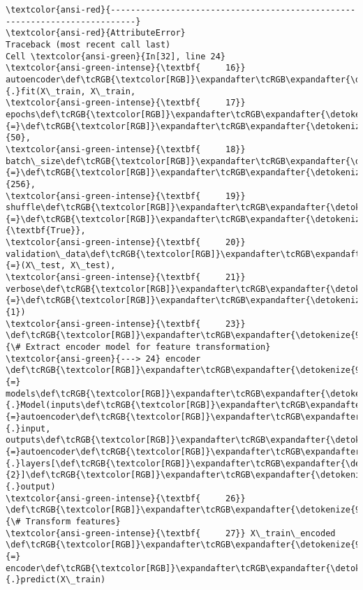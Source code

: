 \documentclass[11pt]{article}
\begin{document}
    \begin{Verbatim}[commandchars=\\\{\}, frame=single, framerule=2mm, rulecolor=\color{outerrorbackground}]
\textcolor{ansi-red}{---------------------------------------------------------------------------}
\textcolor{ansi-red}{AttributeError}                            Traceback (most recent call last)
Cell \textcolor{ansi-green}{In[32], line 24}
\textcolor{ansi-green-intense}{\textbf{     16}} autoencoder\def\tcRGB{\textcolor[RGB]}\expandafter\tcRGB\expandafter{\detokenize{98,98,98}}{.}fit(X\_train, X\_train, 
\textcolor{ansi-green-intense}{\textbf{     17}}                 epochs\def\tcRGB{\textcolor[RGB]}\expandafter\tcRGB\expandafter{\detokenize{98,98,98}}{=}\def\tcRGB{\textcolor[RGB]}\expandafter\tcRGB\expandafter{\detokenize{98,98,98}}{50}, 
\textcolor{ansi-green-intense}{\textbf{     18}}                 batch\_size\def\tcRGB{\textcolor[RGB]}\expandafter\tcRGB\expandafter{\detokenize{98,98,98}}{=}\def\tcRGB{\textcolor[RGB]}\expandafter\tcRGB\expandafter{\detokenize{98,98,98}}{256}, 
\textcolor{ansi-green-intense}{\textbf{     19}}                 shuffle\def\tcRGB{\textcolor[RGB]}\expandafter\tcRGB\expandafter{\detokenize{98,98,98}}{=}\def\tcRGB{\textcolor[RGB]}\expandafter\tcRGB\expandafter{\detokenize{0,135,0}}{\textbf{True}}, 
\textcolor{ansi-green-intense}{\textbf{     20}}                 validation\_data\def\tcRGB{\textcolor[RGB]}\expandafter\tcRGB\expandafter{\detokenize{98,98,98}}{=}(X\_test, X\_test),
\textcolor{ansi-green-intense}{\textbf{     21}}                 verbose\def\tcRGB{\textcolor[RGB]}\expandafter\tcRGB\expandafter{\detokenize{98,98,98}}{=}\def\tcRGB{\textcolor[RGB]}\expandafter\tcRGB\expandafter{\detokenize{98,98,98}}{1})
\textcolor{ansi-green-intense}{\textbf{     23}} \def\tcRGB{\textcolor[RGB]}\expandafter\tcRGB\expandafter{\detokenize{95,135,135}}{\# Extract encoder model for feature transformation}
\textcolor{ansi-green}{---> 24} encoder \def\tcRGB{\textcolor[RGB]}\expandafter\tcRGB\expandafter{\detokenize{98,98,98}}{=} models\def\tcRGB{\textcolor[RGB]}\expandafter\tcRGB\expandafter{\detokenize{98,98,98}}{.}Model(inputs\def\tcRGB{\textcolor[RGB]}\expandafter\tcRGB\expandafter{\detokenize{98,98,98}}{=}autoencoder\def\tcRGB{\textcolor[RGB]}\expandafter\tcRGB\expandafter{\detokenize{98,98,98}}{.}input, outputs\def\tcRGB{\textcolor[RGB]}\expandafter\tcRGB\expandafter{\detokenize{98,98,98}}{=}autoencoder\def\tcRGB{\textcolor[RGB]}\expandafter\tcRGB\expandafter{\detokenize{98,98,98}}{.}layers[\def\tcRGB{\textcolor[RGB]}\expandafter\tcRGB\expandafter{\detokenize{98,98,98}}{2}]\def\tcRGB{\textcolor[RGB]}\expandafter\tcRGB\expandafter{\detokenize{98,98,98}}{.}output)
\textcolor{ansi-green-intense}{\textbf{     26}} \def\tcRGB{\textcolor[RGB]}\expandafter\tcRGB\expandafter{\detokenize{95,135,135}}{\# Transform features}
\textcolor{ansi-green-intense}{\textbf{     27}} X\_train\_encoded \def\tcRGB{\textcolor[RGB]}\expandafter\tcRGB\expandafter{\detokenize{98,98,98}}{=} encoder\def\tcRGB{\textcolor[RGB]}\expandafter\tcRGB\expandafter{\detokenize{98,98,98}}{.}predict(X\_train)


\end{Verbatim}
\end{document}
